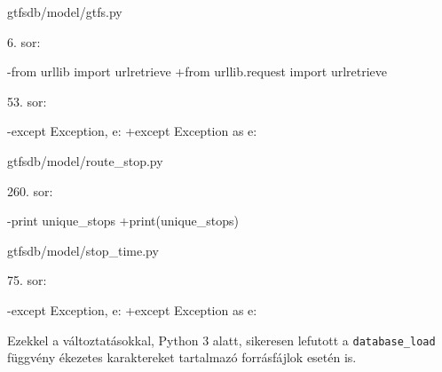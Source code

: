 gtfsdb/model/gtfs.py

6. sor:
\begin{python}
-from urllib import urlretrieve
+from urllib.request import urlretrieve
\end{python}

53. sor:
\begin{python}
-except Exception, e:
+except Exception as e:
\end{python}

gtfsdb/model/route\_stop.py

260. sor:
\begin{python}
-print unique_stops
+print(unique_stops)
\end{python}

gtfsdb/model/stop\_time.py

75. sor:
\begin{python}
-except Exception, e:
+except Exception as e:
\end{python}

Ezekkel a változtatásokkal, Python 3 alatt, sikeresen lefutott a \texttt{database\_load} függvény ékezetes karaktereket tartalmazó forrásfájlok esetén is.
